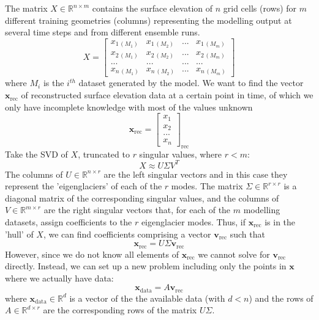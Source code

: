 \documentclass[a4paper]{article}
\begin{document}
The matrix $X \in \mathbb{R}^{n\times m}$ contains the surface elevation of $n$ grid cells (rows) for $m$ different training geometries (columns) representing the modelling output at several time steps and from different ensemble runs.
\begin{equation}
    X =
    \begin{bmatrix}
        x_{1\,(M_1)} & x_{1\,(M_2)} & ... & x_{1\,(M_m)}\\
        x_{2\,(M_1)} & x_{2\,(M_2)} & ... & x_{2\,(M_m)}\\
        ...          & ...          & ... & ...     \\
        x_{n\,(M_1)} & x_{n\,(M_2)} & ... & x_{n\,(M_m)}
    \end{bmatrix}
\end{equation}
where $M_i$ is the $i^{th}$ dataset generated by the model.
We want to find the vector $\mathbf{x}_\mathrm{rec}$ of reconstructed surface elevation data at a certain point in time, of which we only have incomplete knowledge with most of the values unknown
\begin{equation}
    \mathbf{x}_\mathrm{rec} =
    \begin{bmatrix}
        x_1\\
        x_2\\
        ...\\
        x_n       
    \end{bmatrix}_{\mathrm{rec}}
\end{equation}
Take the SVD of $X$, truncated to $r$ singular values, where $r<m$:
\begin{equation}
    X \approx U \Sigma V^T
\end{equation}
The columns of $U \in \mathbb{R}^{n\times r}$ are the left singular vectors and in this case they represent the 'eigenglaciers' of each of the $r$ modes. The matrix $\Sigma \in \mathbb{R}^{r\times r}$ is a diagonal matrix of the corresponding singular values, and the columns of $V \in \mathbb{R}^{m\times r}$ are the right singular vectors that, for each of the $m$ modelling datasets, assign coefficients to the $r$ eigenglacier modes. Thus, if $\mathbf{x}_\mathrm{rec}$ is in the 'hull' of $X$, we can find coefficients comprising a vector $\mathbf{v}_\mathrm{rec}$ such that
\begin{equation}
    \mathbf{x}_\mathrm{rec} = U \Sigma \mathbf{v}_\mathrm{rec}
\end{equation}
However, since we do not know all elements of $\mathbf{x}_\mathrm{rec}$ we cannot solve for $\mathbf{v}_\mathrm{rec}$ directly. Instead, we can set up a new problem including only the points in $\mathbf{x}$ where we actually have data:
\begin{equation}
    \mathbf{x}_\mathrm{data} = A\mathbf{v}_\mathrm{rec}
\end{equation}
where $\mathbf{x}_\mathrm{data} \in \mathbb{R}^d$ is a vector of the the available data (with $d<n$) and the rows of $A\in \mathbb{R}^{d\times r}$ are the corresponding rows of the matrix $U \Sigma$.
\end{document}
